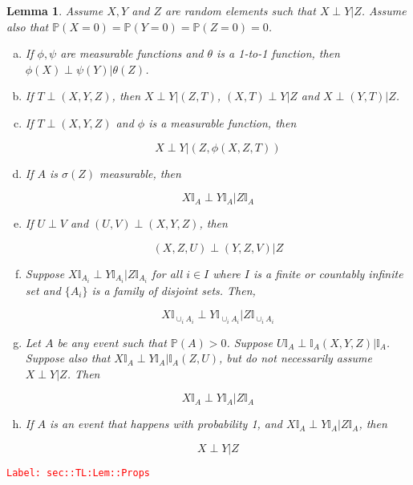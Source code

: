 \documentclass[12pt]{article}
\newcommand{\mb}{\mathbb}
\newcommand{\tr}{\textcolor{red}}
\newcommand{\labe}[1]{\tr{\texttt{Label: #1}}}
\newcommand{\pr}{\mb{P}}							%
\newcommand{\X}{X}								%
\newcommand{\indx}[1]{_{#1}}					%
\newcommand{\XX}{Y}								%
\newcommand{\XXX}{Z}							%
\newcommand{\typset}{A}							%
\newtheorem{lem}[thms]{Lemma}
\begin{document}
\begin{lem}
Assume \(\X,\XX\) and \(\XXX\) are random elements such that \(\X\perp \XX|\XXX\). Assume also that \(\pr(\X=0) = \pr(\XX=0) = \pr(\XXX=0) = 0\).

\begin{enumerate}[(a)]
\item If \(\phi,\psi\) are measurable functions and \(\theta\) is a 1-to-1 function, then \(\phi(\X)\perp \psi(\XX)|\theta(\XXX)\).

\item If \(T\perp(\X,\XX,\XXX)\), then \(\X\perp \XX|(\XXX,T)\), \((\X,T)\perp \XX|\XXX\) and \(\X\perp (\XX,T)|\XXX\).

\item If \(T\perp (\X,\XX,\XXX)\) and \(\phi\) is a measurable function, then

\[\X\perp \XX|(\XXX,\phi(\X,\XXX,T))\]

\item If \(\typset\) is \(\sigma(\XXX)\) measurable, then 

\[\X\mb{I}_\typset\perp \XX\mb{I}_\typset|\XXX\mb{I}_\typset\]

\item If \(U\perp V\) and \((U,V)\perp(\X,\XX,\XXX)\), then 

\[(\X,\XXX,U)\perp (\XX,\XXX,V)|\XXX\]

\item Suppose \(\X\mb{I}_{\typset\indx{i}}\perp \XX\mb{I}_{\typset\indx{i}}|\XXX\mb{I}_{\typset\indx{i}}\) for all \(i\in I\) where \(I\) is a finite or countably infinite set and \(\{\typset\indx{i}\}\) is a family of disjoint sets. Then,

\[\X\mb{I}_{\cup_i \typset\indx{i}}\perp \XX\mb{I}_{\cup_i \typset\indx{i}}|\XXX\mb{I}_{\cup_i \typset\indx{i}}\]

\item Let \(\typset\) be any event such that \(\pr(\typset) > 0\). Suppose \(U\mb{I}_\typset\perp \mb{I}_\typset(\X,\XX,\XXX)|\mb{I}_\typset\). Suppose also that \(\X\mb{I}_\typset\perp \XX\mb{I}_\typset|\mb{I}_\typset(\XXX,U)\), but do not necessarily assume \(\X\perp \XX|\XXX\). Then 

\[\X\mb{I}_\typset\perp \XX\mb{I}_\typset|\XXX\mb{I}_\typset\]

\item If \(\typset\) is an event that happens with probability 1, and \(\X\mb{I}_\typset \perp \XX\mb{I}_\typset |\XXX\mb{I}_\typset\), then 

\[\X\perp \XX |\XXX\]
\end{enumerate}
\label{sec::TL:Lem::Props}
\end{lem}
\labe{sec::TL:Lem::Props}
\end{document}
